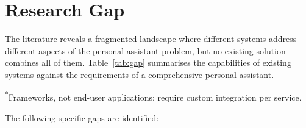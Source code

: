 \section{Research Gap}
\label{sec:gap}

The literature reveals a fragmented landscape where different systems address different aspects of the personal assistant problem, but no existing solution combines all of them. Table~\ref{tab:gap} summarises the capabilities of existing systems against the requirements of a comprehensive personal assistant.

\begin{table}[H]
\centering
\caption{Capability comparison of existing systems}
\label{tab:gap}
\vspace{0.3em}

\footnotesize{\textsuperscript{*}Frameworks, not end-user applications; require custom integration per service.}
\end{table}

The following specific gaps are identified:

